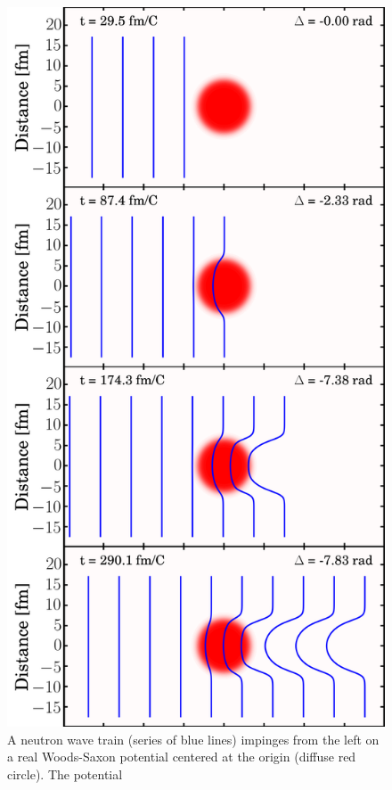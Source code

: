 \begin{figure}[tb]
    \centering
    \includegraphics[height=0.7\textheight]{figures/phaseShiftStillsFigure.png}
    \caption[A illustration of the nuclear Ramsauer effect]
    {
        A neutron wave train (series of
        blue lines) impinges from the left on a real Woods-Saxon
        potential centered at the origin (diffuse red circle). The potential
}
\end{figure}
